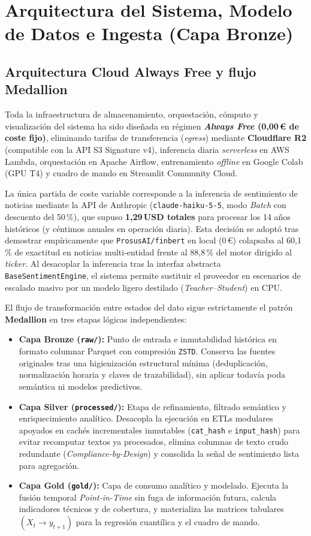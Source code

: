 \chapter{Arquitectura del Sistema, Modelo de Datos e Ingesta (Capa Bronze)}

\section{Arquitectura Cloud Always Free y flujo Medallion}
Toda la infraestructura de almacenamiento, orquestación, cómputo y visualización del sistema ha sido diseñada en régimen \textbf{\textit{Always Free} (0,00\,€ de coste fijo)}, eliminando tarifas de transferencia (\textit{egress}) mediante \textbf{Cloudflare R2} (compatible con la API S3 Signature v4), inferencia diaria \textit{serverless} en AWS Lambda, orquestación en Apache Airflow, entrenamiento \textit{offline} en Google Colab (GPU T4) y cuadro de mando en Streamlit Community Cloud.

La única partida de coste variable corresponde a la inferencia de sentimiento de noticias mediante la API de Anthropic (\texttt{claude-haiku-5-5}, modo \textit{Batch} con descuento del 50\,\%), que supuso \textbf{1,29\,USD totales} para procesar los 14 años históricos (y céntimos anuales en operación diaria). Esta decisión se adoptó tras demostrar empíricamente que \texttt{ProsusAI/finbert} en local (0\,€) colapsaba al 60,1\,\% de exactitud en noticias multi-entidad frente al 88,8\,\% del motor dirigido al \textit{ticker}. Al desacoplar la inferencia tras la interfaz abstracta \texttt{BaseSentimentEngine}, el sistema permite sustituir el proveedor en escenarios de escalado masivo por un modelo ligero destilado (\textit{Teacher--Student}) en CPU.

El flujo de transformación entre estados del dato sigue estrictamente el patrón \textbf{Medallion} en tres etapas lógicas independientes:

\begin{itemize}
    \item \textbf{Capa Bronze (\texttt{raw/}):} Punto de entrada e inmutabilidad histórica en formato columnar Parquet con compresión \texttt{ZSTD}. Conserva las fuentes originales tras una higienización estructural mínima (deduplicación, normalización horaria y claves de trazabilidad), sin aplicar todavía poda semántica ni modelos predictivos.
    \item \textbf{Capa Silver (\texttt{processed/}):} Etapa de refinamiento, filtrado semántico y enriquecimiento analítico. Desacopla la ejecución en ETLs modulares apoyados en cachés incrementales inmutables (\texttt{cat\_hash} e \texttt{input\_hash}) para evitar recomputar textos ya procesados, elimina columnas de texto crudo redundante (\textit{Compliance-by-Design}) y consolida la señal de sentimiento lista para agregación.
    \item \textbf{Capa Gold (\texttt{gold/}):} Capa de consumo analítico y modelado. Ejecuta la fusión temporal \textit{Point-in-Time} sin fuga de información futura, calcula indicadores técnicos y de cobertura, y materializa las matrices tabulares $(X_t \rightarrow y_{t+1})$ para la regresión cuantílica y el cuadro de mando.
\end{itemize}

